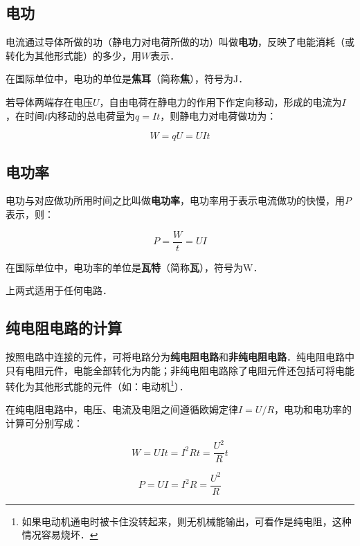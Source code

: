 
\subsection{电功}

电流通过导体所做的功（静电力对电荷所做的功）叫做\textbf{电功}，反映了电能消耗（或转化为其他形式能）的多少，用$W$表示．

在国际单位中，电功的单位是\textbf{焦耳}（简称\textbf{焦}），符号为$\mathrm{J}$．

若导体两端存在电压$U$，自由电荷在静电力的作用下作定向移动，形成的电流为$I$，在时间$t$内移动的总电荷量为$q=It$，则静电力对电荷做功为：

\begin{equation}
W=qU=UIt
\end{equation}

\subsection{电功率}

电功与对应做功所用时间之比叫做\textbf{电功率}，电功率用于表示电流做功的快慢，用$P$表示，则：

\begin{equation}
P=\frac{W}{t}=UI
\end{equation}

在国际单位中，电功率的单位是\textbf{瓦特}（简称\textbf{瓦}），符号为$\mathrm{W}$．

上两式适用于任何电路．

\subsection{纯电阻电路的计算}

按照电路中连接的元件，可将电路分为\textbf{纯电阻电路}和\textbf{非纯电阻电路}．纯电阻电路中只有电阻元件，电能全部转化为内能；非纯电阻电路除了电阻元件还包括可将电能转化为其他形式能的元件（如：电动机\footnote{如果电动机通电时被卡住没转起来，则无机械能输出，可看作是纯电阻，这种情况容易烧坏．}）．

在纯电阻电路中，电压、电流及电阻之间遵循欧姆定律$I=U/R$，电功和电功率的计算可分别写成：

\begin{equation}
W=UIt=I^2 Rt=\frac{U^2}{R}t
\end{equation}

\begin{equation}
P=UI=I^2 R=\frac{U^2}{R}
\end{equation}

